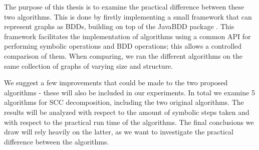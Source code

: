 \documentclass[../master/master.tex]{subfiles}
\begin{document}
The purpose of this thesis is to examine the practical difference between these two algorithms. This is done by firstly implementing a small framework that can represent graphs as BDDs, building on top of the JavaBDD package \cite{whaley}. This framework facilitates the implementation of algorithms using a common API for performing symbolic operations and BDD operations; this allows a controlled comparison of them. 
When comparing, we ran the different algorithms on the same collection of graphs of varying size and structure.

We suggest a few improvements that could be made to the two proposed algorithms - these will also be included in our experiments. In total we examine 5 algorithms for SCC decomposition, including the two original algorithms. The results will be analyzed with respect to the amount of symbolic steps taken and with respect to the practical run time of the algorithms. The final conclusions we draw will rely heavily on the latter, as we want to investigate the practical difference between the algorithms.
\end{document}
